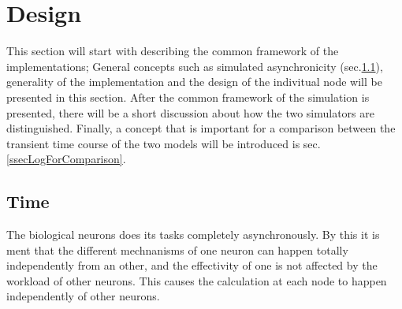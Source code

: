 \section{Design} %

	This section will start with describing the common framework of the implementations; 
		General concepts such as simulated asynchronicity (sec.\ref{ssecTime}), generality of the implementation and the design of the indivitual node will be presented in this section. %
	After the common framework of the simulation is presented, there will be a short discussion about how the two simulators are distinguished. %
	Finally, a concept that is important for a comparison between the transient time course of the two models will be introduced is sec. \ref{ssecLogForComparison}. %
	
	




	\subsection{Time}
	\label{ssecTime}
	The biological neurons does its tasks completely asynchronously.
	By this it is ment that the different mechnanisms of one neuron can happen totally independently from an other, and the effectivity of one is not affected by the workload of other neurons.
	This causes the calculation at each node to happen independently of other neurons.


